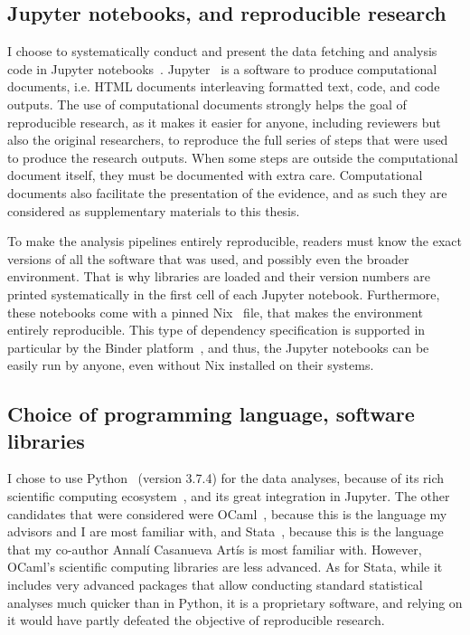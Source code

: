 \subsection{Jupyter notebooks, and reproducible research}

I choose to systematically conduct and present the data fetching and analysis code in Jupyter notebooks~\cite{zimmermann2019bugtracker,zimmermann2019ci,zimmermann2019community,zimmermann2019contributors,zimmermann2019librariesio,zimmermann2019templates}.
Jupyter~\cite{Kluyver:2016aa} is a software to produce computational documents, i.e. HTML documents interleaving formatted text, code, and code outputs.
The use of computational documents strongly helps the goal of reproducible research, as it makes it easier for anyone, including reviewers but also the original researchers, to reproduce the full series of steps that were used to produce the research outputs.
When some steps are outside the computational document itself, they must be documented with extra care.
Computational documents also facilitate the presentation of the evidence, and as such they are considered as supplementary materials to this thesis.

To make the analysis pipelines entirely reproducible, readers must know the exact versions of all the software that was used, and possibly even the broader environment.
That is why libraries are loaded and their version numbers are printed systematically in the first cell of each Jupyter notebook.
Furthermore, these notebooks come with a pinned Nix~\cite{dolstra2004nix} file, that makes the environment entirely reproducible.
This type of dependency specification is supported in particular by the Binder platform~\cite{jupyter2018binder}, and thus, the Jupyter notebooks can be easily run by anyone, even without Nix installed on their systems.

\subsection{Choice of programming language, software libraries}

I chose to use Python~\cite{van2007python} (version 3.7.4) for the data analyses, because of its rich scientific computing ecosystem~\cite{perez2010python}, and its great integration in Jupyter.
The other candidates that were considered were OCaml~\cite{leroy:hal-00930213}, because this is the language my advisors and I are most familiar with, and Stata~\cite{statacorp2013stata}, because this is the language that my co-author Annal\'i Casanueva Art\'is is most familiar with.
However, OCaml's scientific computing libraries are less advanced.
As for Stata, while it includes very advanced packages that allow conducting standard statistical analyses much quicker than in Python, it is a proprietary software, and relying on it would have partly defeated the objective of reproducible research.

